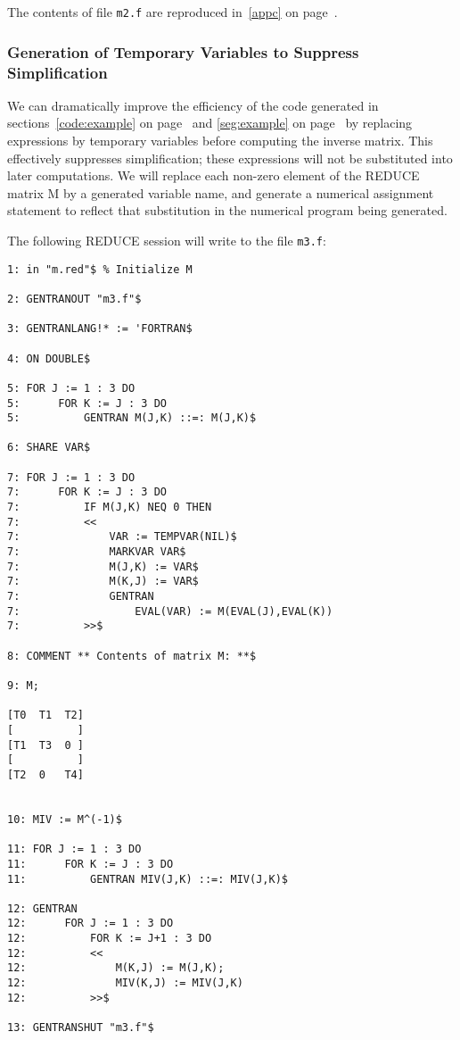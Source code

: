 The contents of file {\tt m2.f} are reproduced in~\ref{appc} on
page~\pageref{appc}.

\subsubsection{Generation of Temporary Variables to Suppress Simplification}
\label{tempvar:example}
We can dramatically improve the efficiency of the code generated
in sections~\ref{code:example} on page~\pageref{code:example} and
\ref{seg:example} on page~\pageref{seg:example}
by replacing expressions by temporary variables before computing the
inverse matrix.  This effectively suppresses simplification; these
expressions will not be substituted into later computations.  We
will replace each non-zero element of the REDUCE matrix M by a
generated variable name, and generate a numerical assignment statement
to reflect that substitution in the numerical program being generated.

The following REDUCE session will write to the file {\tt m3.f}:
\begin{verbatim}
1: in "m.red"$ % Initialize M

2: GENTRANOUT "m3.f"$ 

3: GENTRANLANG!* := 'FORTRAN$ 

4: ON DOUBLE$

5: FOR J := 1 : 3 DO 
5:      FOR K := J : 3 DO 
5:          GENTRAN M(J,K) ::=: M(J,K)$ 

6: SHARE VAR$ 

7: FOR J := 1 : 3 DO 
7:      FOR K := J : 3 DO 
7:          IF M(J,K) NEQ 0 THEN 
7:          << 
7:              VAR := TEMPVAR(NIL)$ 
7:              MARKVAR VAR$ 
7:              M(J,K) := VAR$ 
7:              M(K,J) := VAR$ 
7:              GENTRAN 
7:                  EVAL(VAR) := M(EVAL(J),EVAL(K)) 
7:          >>$ 

8: COMMENT ** Contents of matrix M: **$ 

9: M; 

[T0  T1  T2]
[          ]
[T1  T3  0 ]
[          ]
[T2  0   T4]


10: MIV := M^(-1)$ 

11: FOR J := 1 : 3 DO 
11:      FOR K := J : 3 DO 
11:          GENTRAN MIV(J,K) ::=: MIV(J,K)$ 

12: GENTRAN 
12:      FOR J := 1 : 3 DO 
12:          FOR K := J+1 : 3 DO 
12:          << 
12:              M(K,J) := M(J,K); 
12:              MIV(K,J) := MIV(J,K) 
12:          >>$ 

13: GENTRANSHUT "m3.f"$ 
\end{verbatim}

